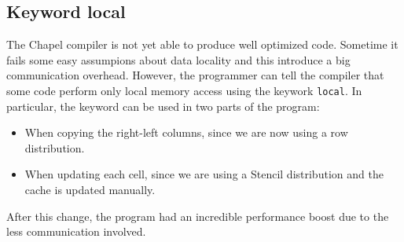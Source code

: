 \documentclass{article}
\begin{document}
\subsection{Keyword local}
The Chapel compiler is not yet able to produce well optimized code. Sometime it fails some easy assumpions about data locality and this introduce a big communication overhead. However, the programmer can tell the compiler that some code perform only local memory access using the keywork \texttt{local}. In particular, the keyword can be used in two parts of the program:
\begin{itemize}
    \item When copying the right-left columns, since we are now using a row distribution.
    \item When updating each cell, since we are using a Stencil distribution and the cache is updated manually.
\end{itemize}
After this change, the program had an incredible performance boost due to the less communication involved.
\end{document}
